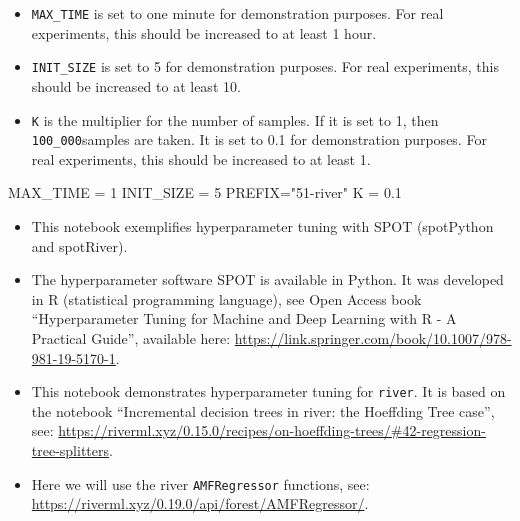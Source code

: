 \documentclass[
  letterpaper,
  DIV=11,
  numbers=noendperiod]{scrreprt}
\newenvironment{Shaded}{\begin{snugshade}}{\end{snugshade}}
\newcommand{\DecValTok}[1]{\textcolor[rgb]{0.68,0.00,0.00}{#1}}
\newcommand{\FloatTok}[1]{\textcolor[rgb]{0.68,0.00,0.00}{#1}}
\newcommand{\NormalTok}[1]{\textcolor[rgb]{0.00,0.23,0.31}{#1}}
\newcommand{\OperatorTok}[1]{\textcolor[rgb]{0.37,0.37,0.37}{#1}}
\newcommand{\StringTok}[1]{\textcolor[rgb]{0.13,0.47,0.30}{#1}}
\providecommand{\tightlist}{%
  \setlength{\itemsep}{0pt}\setlength{\parskip}{0pt}}\usepackage{longtable,booktabs,array}
\begin{document}
\begin{tcolorbox}[enhanced jigsaw, left=2mm, toprule=.15mm, colframe=quarto-callout-caution-color-frame, leftrule=.75mm, title=\textcolor{quarto-callout-caution-color}{\faFire}\hspace{0.5em}{Caution: Run time and initial design size should be increased for real
experiments}, toptitle=1mm, opacitybacktitle=0.6, arc=.35mm, titlerule=0mm, opacityback=0, bottomtitle=1mm, coltitle=black, rightrule=.15mm, colback=white, colbacktitle=quarto-callout-caution-color!10!white, breakable, bottomrule=.15mm]

\begin{itemize}
\tightlist
\item
  \texttt{MAX\_TIME} is set to one minute for demonstration purposes.
  For real experiments, this should be increased to at least 1 hour.
\item
  \texttt{INIT\_SIZE} is set to 5 for demonstration purposes. For real
  experiments, this should be increased to at least 10.
\item
  \texttt{K} is the multiplier for the number of samples. If it is set
  to 1, then \texttt{100\_000}samples are taken. It is set to 0.1 for
  demonstration purposes. For real experiments, this should be increased
  to at least 1.
\end{itemize}

\end{tcolorbox}

\begin{Shaded}
\begin{Highlighting}[]
\NormalTok{MAX\_TIME }\OperatorTok{=} \DecValTok{1}
\NormalTok{INIT\_SIZE }\OperatorTok{=} \DecValTok{5}
\NormalTok{PREFIX}\OperatorTok{=}\StringTok{"51{-}river"}
\NormalTok{K }\OperatorTok{=} \FloatTok{0.1}
\end{Highlighting}
\end{Shaded}

\begin{itemize}
\tightlist
\item
  This notebook exemplifies hyperparameter tuning with SPOT (spotPython
  and spotRiver).
\item
  The hyperparameter software SPOT is available in Python. It was
  developed in R (statistical programming language), see Open Access
  book ``Hyperparameter Tuning for Machine and Deep Learning with R - A
  Practical Guide'', available here:
  \url{https://link.springer.com/book/10.1007/978-981-19-5170-1}.
\item
  This notebook demonstrates hyperparameter tuning for \texttt{river}.
  It is based on the notebook ``Incremental decision trees in river: the
  Hoeffding Tree case'', see:
  \url{https://riverml.xyz/0.15.0/recipes/on-hoeffding-trees/\#42-regression-tree-splitters}.
\item
  Here we will use the river \texttt{AMFRegressor} functions, see:
  \url{https://riverml.xyz/0.19.0/api/forest/AMFRegressor/}.
\end{itemize}
\end{document}
